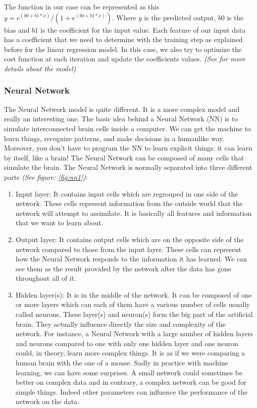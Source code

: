 \documentclass[a4]{article}
\begin{document}
The function in our case can be represented as this $y = e^{(b0 + b1*x)} / (1 + e^{(b0 + b1*x)}) $. Where $y$ is the predicted output, $b0$ is the bias and $b1$ is the coefficient for the input value. Each feature of our input data has a coefficient that we need to determine with the training step as explained before for the linear regression model. In this case, we also try to optimize the cost function at each iteration and update the coefficients values. \textit{(See \cite{brownlee3} for more details about the model)}

\subsubsection{Neural Network}
The Neural Network model is quite different. It is a more complex model and really an interesting one. The basic idea behind a Neural Network (NN) is to simulate interconnected brain cells inside a computer. We can get the machine to learn things, recognize patterns, and make decisions in a humanlike way. Moreover, you don't have to program the NN to learn explicit things: it can learn by itself, like a brain! The Neural Network can be composed of many cells that simulate the brain. The Neural Network is normally separated into three different parts \textit{(See figure: \ref{fig:nn1})}: 
\begin{enumerate}
\item Input layer: It contains input cells which are regrouped in one side of the network. These cells represent information from the outside world that the network will attempt to assimilate. It is basically all features and information that we want to learn about.
\item Output layer: It contains output cells which are on the opposite side of the network compared to those from the input layer. These cells can represent how the Neural Network responds to the information it has learned. We can see them as the result provided by the network after the data has gone throughout all of it. 
\item Hidden layer(s): It is in the middle of the network. It can be composed of one or more layers which can each of them have a various number of cells usually called neurons. These layer(s) and neuron(s) form the big part of the artificial brain. They actually influence directly the size and complexity of the network. For instance, a Neural Network with a large number of hidden layers and neurons compared to one with only one hidden layer and one neuron could, in theory, learn more complex things. It is as if we were comparing a human brain with the one of a mouse. Sadly in practice with machine learning, we can have some surprises. A small network could sometimes be better on complex data and in contrary, a complex network can be good for simple things. Indeed other parameters can influence the performance of the network on the data. 
\end{enumerate}
\end{document}
